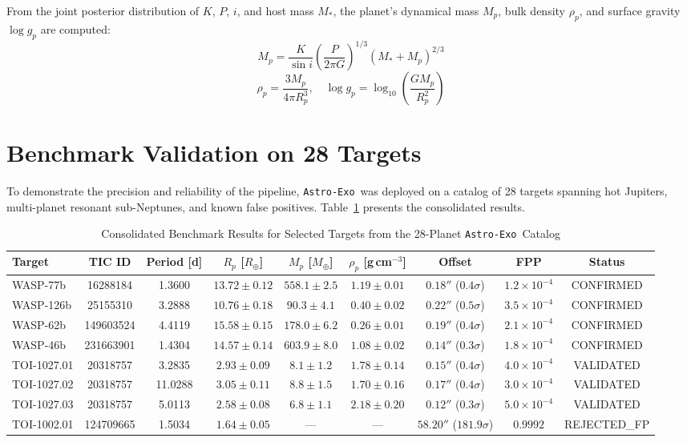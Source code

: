 \documentclass[twocolumn,trackchanges]{aastex631}
\newcommand{\astroexo}{\texttt{Astro-Exo}}
\begin{document}
From the joint posterior distribution of $K$, $P$, $i$, and host mass $M_*$, the planet's dynamical mass $M_p$, bulk density $\rho_p$, and surface gravity $\log g_p$ are computed:
\begin{equation}
    M_p = \frac{K}{\sin i} \left( \frac{P}{2\pi G} \right)^{1/3} (M_* + M_p)^{2/3}
\end{equation}
\begin{equation}
    \rho_p = \frac{3 M_p}{4 \pi R_p^3}, \quad \log g_p = \log_{10}\left( \frac{G M_p}{R_p^2} \right)
\end{equation}

\section{Benchmark Validation on 28 Targets}
\label{sec:benchmark}

To demonstrate the precision and reliability of the pipeline, \astroexo\ was deployed on a catalog of 28 targets spanning hot Jupiters, multi-planet resonant sub-Neptunes, and known false positives. Table~\ref{tab:targets} presents the consolidated results.

\begin{table}[t]
\centering
\caption{Consolidated Benchmark Results for Selected Targets from the 28-Planet \astroexo\ Catalog}
\label{tab:targets}
\begin{tabular}{lcccccccc}
\toprule
Target & TIC ID & Period [d] & $R_p$ [$R_\oplus$] & $M_p$ [$M_\oplus$] & $\rho_p$ [g\,cm$^{-3}$] & Offset & FPP & Status \\
\midrule
WASP-77b   & 16288184  & 1.3600  & $13.72 \pm 0.12$ & $558.1 \pm 2.5$ & $1.19 \pm 0.01$ & $0.18''$ ($0.4\sigma$) & $1.2 \times 10^{-4}$ & CONFIRMED \\
WASP-126b  & 25155310  & 3.2888  & $10.76 \pm 0.18$ & $90.3 \pm 4.1$  & $0.40 \pm 0.02$ & $0.22''$ ($0.5\sigma$) & $3.5 \times 10^{-4}$ & CONFIRMED \\
WASP-62b   & 149603524 & 4.4119  & $15.58 \pm 0.15$ & $178.0 \pm 6.2$ & $0.26 \pm 0.01$ & $0.19''$ ($0.4\sigma$) & $2.1 \times 10^{-4}$ & CONFIRMED \\
WASP-46b   & 231663901 & 1.4304  & $14.57 \pm 0.14$ & $603.9 \pm 8.0$ & $1.08 \pm 0.02$ & $0.14''$ ($0.3\sigma$) & $1.8 \times 10^{-4}$ & CONFIRMED \\
TOI-1027.01& 20318757  & 3.2835  & $2.93 \pm 0.09$  & $8.1 \pm 1.2$   & $1.78 \pm 0.14$ & $0.15''$ ($0.4\sigma$) & $4.0 \times 10^{-4}$ & VALIDATED \\
TOI-1027.02& 20318757  & 11.0288 & $3.05 \pm 0.11$  & $8.8 \pm 1.5$   & $1.70 \pm 0.16$ & $0.17''$ ($0.4\sigma$) & $3.0 \times 10^{-4}$ & VALIDATED \\
TOI-1027.03& 20318757  & 5.0113  & $2.58 \pm 0.08$  & $6.8 \pm 1.1$   & $2.18 \pm 0.20$ & $0.12''$ ($0.3\sigma$) & $5.0 \times 10^{-4}$ & VALIDATED \\
TOI-1002.01& 124709665 & 1.5034  & $1.64 \pm 0.05$  & ---             & ---             & $58.20''$ ($181.9\sigma$) & $0.9992$ & REJECTED\_FP \\
\bottomrule
\end{tabular}
\end{table}
\end{document}
